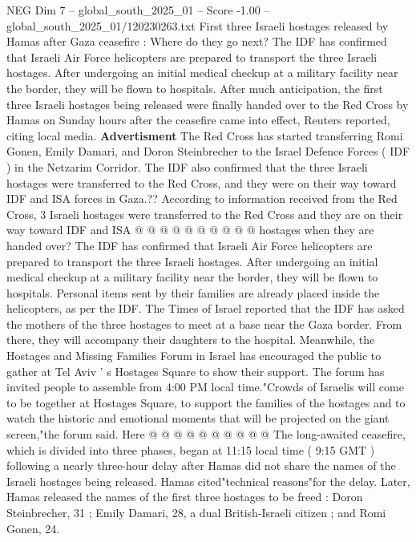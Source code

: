 \begin{textsample}{NEG Dim 7 – global\_south\_2025\_01 – Score -1.00 – global\_south\_2025\_01/120230263.txt}  \label{ex:f7_neg_111}
First three Israeli hostages released by Hamas after Gaza ceasefire : Where do they go next?
The IDF has confirmed that Israeli Air Force helicopters are prepared to transport the three Israeli hostages.
After undergoing an initial medical checkup at a military facility near the border, they will be flown to hospitals.
After much anticipation, the first three Israeli hostages being released were finally handed over to the Red Cross by Hamas on Sunday hours after the ceasefire came into effect, Reuters reported, citing local media. \textbf{Advertisment} The Red Cross has started transferring Romi Gonen, Emily Damari, and Doron Steinbrecher to the Israel Defence Forces ( IDF ) in the Netzarim Corridor.
The IDF also confirmed that the three Israeli hostages were transferred to the Red Cross, and they were on their way toward IDF and ISA forces in Gaza.??
According to information received from the Red Cross, 3 Israeli hostages were transferred to the Red Cross and they are on their way toward IDF and ISA @ @ @ @ @ @ @ @ @ @ hostages when they are handed over?
The IDF has confirmed that Israeli Air Force helicopters are prepared to transport the three Israeli hostages.
After undergoing an initial medical checkup at a military facility near the border, they will be flown to hospitals.
Personal items sent by their families are already placed inside the helicopters, as per the IDF.
The Times of Israel reported that the IDF has asked the mothers of the three hostages to meet at a base near the Gaza border.
From there, they will accompany their daughters to the hospital.
Meanwhile, the Hostages and Missing Families Forum in Israel has encouraged the public to gather at Tel Aviv ' s Hostages Square to show their support.
The forum has invited people to assemble from 4:00 PM local time."Crowds of Israelis will come to be together at Hostages Square, to support the families of the hostages and to watch the historic and emotional moments that will be projected on the giant screen,"the forum said.
Here @ @ @ @ @ @ @ @ @ @ The long-awaited ceasefire, which is divided into three phases, began at 11:15 local time ( 9:15 GMT ) following a nearly three-hour delay after Hamas did not share the names of the Israeli hostages being released.
Hamas cited"technical reasons"for the delay.
Later, Hamas released the names of the first three hostages to be freed : Doron Steinbrecher, 31 ; Emily Damari, 28, a dual British-Israeli citizen ; and Romi Gonen, 24.

\end{textsample}
